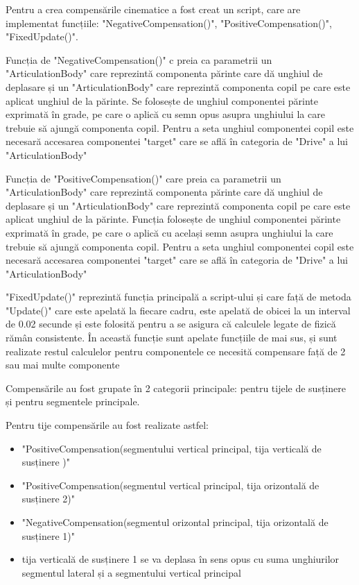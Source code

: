 Pentru a crea compensările cinematice a fost creat un script, care are implementat funcțiile: "NegativeCompensation()", "PositiveCompensation()", "FixedUpdate()".

Funcția de "NegativeCompensation()" c preia ca parametrii un "ArticulationBody" care reprezintă componenta părinte  care dă unghiul de deplasare și un "ArticulationBody" care reprezintă componenta copil pe care este aplicat unghiul de la părinte. 
 Se folosește de unghiul componentei părinte exprimată în grade, pe care o aplică cu semn opus asupra unghiului la care trebuie să ajungă componenta copil. Pentru a seta unghiul componentei copil este necesară accesarea componentei "target" care se află în categoria de "Drive" a lui "ArticulationBody"
  
  
 Funcția de "PositiveCompensation()"  care preia ca parametrii un "ArticulationBody" care reprezintă componenta părinte care dă unghiul de deplasare și un "ArticulationBody" care reprezintă componenta copil pe care este aplicat unghiul de la părinte. 
Funcția  folosește de unghiul componentei părinte exprimată în grade, pe care o aplică cu același semn asupra unghiului la care trebuie să ajungă componenta copil. Pentru a seta unghiul componentei copil este necesară accesarea componentei "target" care se află în categoria de "Drive" a lui "ArticulationBody"

 "FixedUpdate()" reprezintă funcția principală a script-ului și care față de metoda "Update()" care este apelată la fiecare cadru, este apelată de obicei la un interval de 0.02 secunde și este folosită pentru a se asigura că calculele legate de fizică rămân consistente. În această funcție sunt apelate funcțiile de mai sus, și sunt  realizate restul calculelor pentru componentele ce necesită compensare față de 2 sau mai multe componente


Compensările au fost grupate în 2 categorii principale: pentru tijele de susținere și pentru segmentele principale.

Pentru tije compensările au fost realizate astfel:
\begin{itemize}
	\item"PositiveCompensation(segmentului vertical principal, tija verticală de susținere )"
	
	\item"PositiveCompensation(segmentul vertical principal,  tija orizontală de susținere 2)"
	
	
	
	\item "NegativeCompensation(segmentul orizontal principal, tija orizontală de susținere 1)"
	
	
	
	\item  tija verticală de susținere 1 se va deplasa în sens opus cu suma unghiurilor segmentul lateral  și a segmentului vertical principal
\end{itemize}

